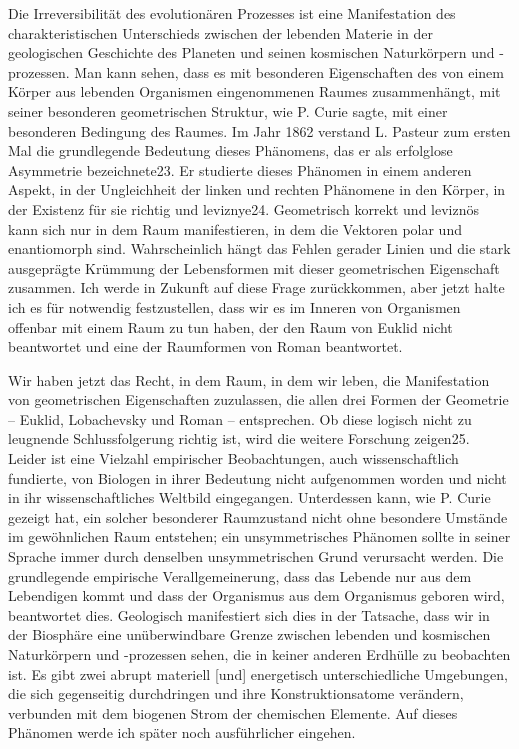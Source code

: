 \documentclass[11pt,a4paper]{book}
\begin{document}
Die Irreversibilität des evolutionären Prozesses ist eine Manifestation des
charakteristischen Unterschieds zwischen der lebenden Materie in der
geologischen Geschichte des Planeten und seinen kosmischen Naturkörpern und
-prozessen. Man kann sehen, dass es mit besonderen Eigenschaften des von einem
Körper aus lebenden Organismen eingenommenen Raumes zusammenhängt, mit seiner
besonderen geometrischen Struktur, wie P. Curie sagte, mit einer besonderen
Bedingung des Raumes. Im Jahr 1862 verstand L. Pasteur zum ersten Mal die
grundlegende Bedeutung dieses Phänomens, das er als erfolglose Asymmetrie
bezeichnete23. Er studierte dieses Phänomen in einem anderen Aspekt, in der
Ungleichheit der linken und rechten Phänomene in den Körper, in der Existenz
für sie richtig und leviznye24. Geometrisch korrekt und leviznös kann sich nur
in dem Raum manifestieren, in dem die Vektoren polar und enantiomorph
sind. Wahrscheinlich hängt das Fehlen gerader Linien und die stark ausgeprägte
Krümmung der Lebensformen mit dieser geometrischen Eigenschaft zusammen. Ich
werde in Zukunft auf diese Frage zurückkommen, aber jetzt halte ich es für
notwendig festzustellen, dass wir es im Inneren von Organismen offenbar mit
einem Raum zu tun haben, der den Raum von Euklid nicht beantwortet und eine
der Raumformen von Roman beantwortet.

Wir haben jetzt das Recht, in dem Raum, in dem wir leben, die Manifestation
von geometrischen Eigenschaften zuzulassen, die allen drei Formen der
Geometrie -- Euklid, Lobachevsky und Roman -- entsprechen. Ob diese logisch
nicht zu leugnende Schlussfolgerung richtig ist, wird die weitere Forschung
zeigen25. Leider ist eine Vielzahl empirischer Beobachtungen, auch
wissenschaftlich fundierte, von Biologen in ihrer Bedeutung nicht aufgenommen
worden und nicht in ihr wissenschaftliches Weltbild eingegangen. Unterdessen
kann, wie P. Curie gezeigt hat, ein solcher besonderer Raumzustand nicht ohne
besondere Umstände im gewöhnlichen Raum entstehen; ein unsymmetrisches
Phänomen sollte in seiner Sprache immer durch denselben unsymmetrischen Grund
verursacht werden. Die grundlegende empirische Verallgemeinerung, dass das
Lebende nur aus dem Lebendigen kommt und dass der Organismus aus dem
Organismus geboren wird, beantwortet dies. Geologisch manifestiert sich dies
in der Tatsache, dass wir in der Biosphäre eine unüberwindbare Grenze zwischen
lebenden und kosmischen Naturkörpern und -prozessen sehen, die in keiner
anderen Erdhülle zu beobachten ist. Es gibt zwei abrupt materiell [und]
energetisch unterschiedliche Umgebungen, die sich gegenseitig durchdringen und
ihre Konstruktionsatome verändern, verbunden mit dem biogenen Strom der
chemischen Elemente. Auf dieses Phänomen werde ich später noch ausführlicher
eingehen.
\end{document}
